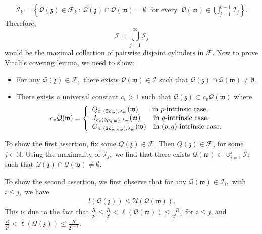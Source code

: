 \documentclass[11pt,oneside, english,reqno,twoside a4paper]{amsart}
\theoremstyle{definition}
\numberwithin{theorem}{section}
\numberwithin{equation}{section}
\newcommand{\mcf}{\mathcal{F}}
\newcommand{\NN}{\mathbb{N}}
\begin{document}
\begin{align*}
    \mathcal{I}_k=\left\{\mathcal{Q}(\mathfrak{z})\in \mcf_k \, : \, \mathcal{Q}(\mathfrak{z})\cap \mathcal{Q}(\mathfrak{w})=\emptyset\,\,\, \text{for every}\,\,\, \mathcal{Q}(\mathfrak{w}) \in \bigcup_{j=1}^{k-1}\mathcal{I}_j \right\}. 
\end{align*}
Therefore, 
$$
\mathcal{I}=\bigcup_{j=1}^{\infty}\mathcal{I}_j
$$
would be the maximal collection of pairwise disjoint cylinders in $\mcf.$ Now to prove Vitali's covering lemma, we need to show:
\begin{itemize}
\item[(i)] For any $\mathcal{Q}(\mathfrak{z}) \in \mcf,$ there exists $\mathcal{Q}(\mathfrak{w}) \in \mathcal{I}$ such that $\mathcal{Q}(\mathfrak{z}) \cap \mathcal{Q}(\mathfrak{w}) \neq \emptyset.$
\item[(ii)] There exists a universal constant $c_v>1$ such that $\mathcal{Q}(\mathfrak{z}) \subset c_v \mathcal{Q}(\mathfrak{w})$ where 
$$
c_v\mathcal{Q}(\mathfrak{w})=\left\{
    \begin{array}{l c}
        Q_{c_v(2\rho_\mathfrak{w}),\lambda_\mathfrak{w}}(\mathfrak{w})\,\,\,\,\,\, \quad \text{in $p$-intrinsic case},\\
        J_{c_v(2\rho_{q;\mathfrak{w}}),\lambda_\mathfrak{w}}(\mathfrak{w})\,\,\,\,\, \quad \text{in $q$-intrinsic case},\\
        G_{c_v(2\rho_{p,q;\mathfrak{w}}),\lambda_\mathfrak{w}}(\mathfrak{w}) \quad \text{in $(p,q)$-intrinsic case}.
    \end{array}
    \right.
$$
\end{itemize}
To show the first assertion, fix some $Q(\mathfrak{z}) \in \mcf.$ Then $Q(\mathfrak{z}) \in \mcf_j$ for some $j \in \NN.$ Using the maximality of $\mathcal{I}_j,$ we find that there exists $\mathcal{Q}(\mathfrak{w})\in \cup_{i=1}^{j}\mathcal{I}_i$ such that $\mathcal{Q}(\mathfrak{z})\cap \mathcal{Q}(\mathfrak{w})\neq \emptyset.$ 

To show the second assertion, we first observe that for any $\mathcal{Q}(\mathfrak{w}) \in \mathcal{I}_i,$ with $i\leq j,$ we have
\begin{align}\label{radius compare}
    l(\mathcal{Q}(\mathfrak{z}))\leq 2l(\mathcal{Q}(\mathfrak{w})).
\end{align}
This is due to the fact that
$\frac{R}{2^j}\leq \frac{R}{2^i}<\ell(\mathcal Q(\mathfrak w)) \leq \frac{R}{2^{i-1}}$ for $i\leq j$, and $\frac{R}{2^j}<\ell(\mathcal Q(\mathfrak z)) \leq \frac{R}{2^{j-1}}$. 
\end{document}
